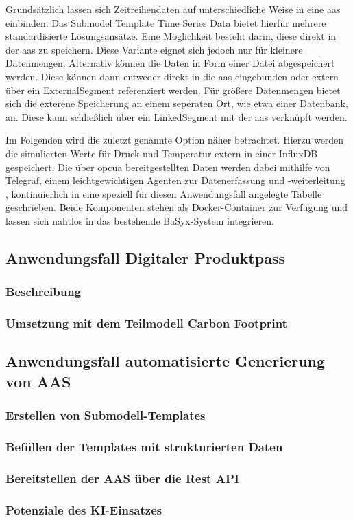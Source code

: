 Grundsätzlich lassen sich Zeitreihendaten auf unterschiedliche Weise in eine \acs{aas} einbinden.
Das Submodel Template Time Series Data \cite{SpezifikationTimeSeriesData} bietet hierfür mehrere standardisierte Lösungsansätze.
Eine Möglichkeit besteht darin, diese direkt in der \acs{aas} zu speichern.
Diese Variante eignet sich jedoch nur für kleinere Datenmengen.
Alternativ können die Daten in Form einer Datei abgespeichert werden.
Diese können dann entweder direkt in die \acs{aas} eingebunden oder extern über ein ExternalSegment referenziert werden.
Für größere Datenmengen bietet sich die exterene Speicherung an einem seperaten Ort, wie etwa einer Datenbank, an.
Diese kann schließlich über ein LinkedSegment mit der \acs{aas} verknüpft werden.

Im Folgenden wird die zuletzt genannte Option näher betrachtet.
Hierzu werden die simulierten Werte für Druck und Temperatur extern in einer InfluxDB gespeichert.
Die über \acs{opcua} bereitgestellten Daten werden dabei mithilfe von Telegraf, einem leichtgewichtigen Agenten zur Datenerfassung und -weiterleitung \cite{Influx}, kontinuierlich in eine speziell für diesen Anwendungsfall angelegte Tabelle geschrieben.
Beide Komponenten stehen als Docker-Container zur Verfügung und lassen sich nahtlos in das bestehende BaSyx-System integrieren.



\subsection{Anwendungsfall Digitaler Produktpass}
\subsubsection{Beschreibung}
\subsubsection{Umsetzung mit dem Teilmodell Carbon Footprint}
\subsection{Anwendungsfall automatisierte Generierung von AAS}
\subsubsection{Erstellen von Submodell-Templates}
\subsubsection{Befüllen der Templates mit strukturierten Daten}
\subsubsection{Bereitstellen der AAS über die Rest API}
\subsubsection{Potenziale des KI-Einsatzes}